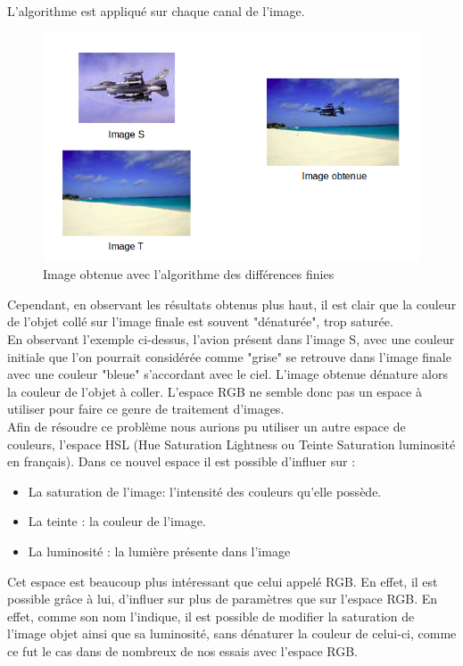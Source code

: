 L'algorithme est appliqué sur chaque canal de l'image.\\
 \begin{figure}[H]
 \centering
 \includegraphics[scale=0.5]{Images/couleur.png}
 \caption{Image obtenue avec l'algorithme des différences finies}
 \end{figure}
Cependant, en observant les résultats obtenus plus haut, il est clair que la couleur de l'objet collé sur l'image finale est souvent "dénaturée", trop saturée.\\
En observant l'exemple ci-dessus, l'avion présent dans l'image S, avec une couleur initiale que l'on pourrait considérée comme "grise" se retrouve dans l'image finale avec une couleur "bleue" s'accordant avec le ciel. L'image obtenue dénature alors la couleur de l'objet à coller.  L'espace RGB ne semble donc pas un espace à utiliser pour faire ce genre de  traitement d'images. \\
Afin de résoudre ce problème nous aurions pu utiliser un autre espace de couleurs, l'espace HSL (Hue Saturation Lightness ou Teinte Saturation luminosité en français). Dans ce nouvel espace il est possible d'influer sur : 
\begin{itemize}
\item La saturation de l'image: l'intensité des couleurs qu'elle possède.
\item  La teinte  :  la couleur de l'image.
\item La luminosité : la lumière présente dans l'image
\end{itemize} 
Cet espace est beaucoup plus intéressant que celui appelé RGB. En effet,  il est possible grâce à lui, d'influer sur plus de paramètres que sur l'espace RGB. En effet, comme son nom l'indique, il est possible de modifier la saturation de l'image objet ainsi que sa luminosité, sans dénaturer la couleur de celui-ci, comme ce fut le cas dans de nombreux de nos essais avec l'espace RGB. \cite{Couleur}